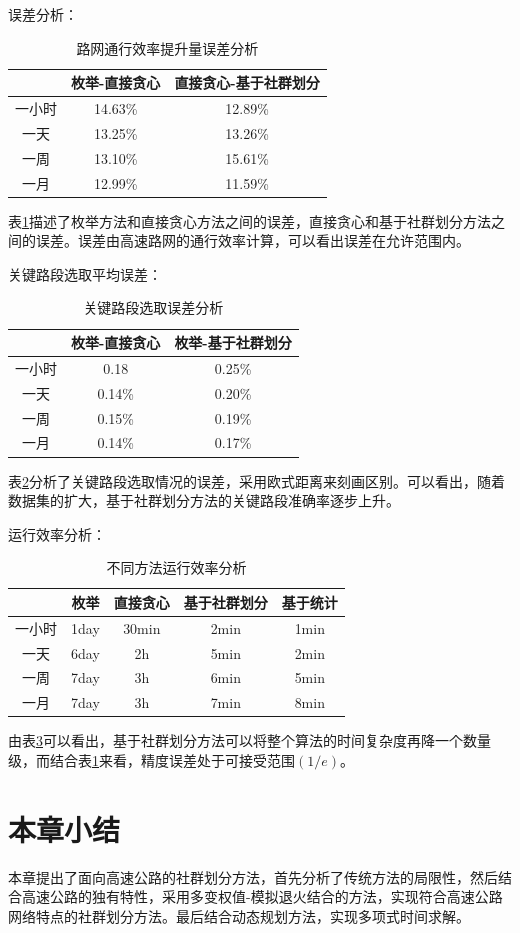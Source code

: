 		误差分析：

				\begin{table}[h]
				\centering
				\begin{tabular}{|c|c|c|}
				\hline
				\hline
				  &  枚举-直接贪心 &  直接贪心-基于社群划分 \\
				\hline
				 一小时 &  14.63\% &  12.89\% \\
				\hline
				 一天 &  13.25\% &  13.26\% \\
				\hline
				 一周 &  13.10\% &  15.61\% \\
				\hline
				 一月 &  12.99\% &  11.59\% \\
				\hline
				\end{tabular}
				\caption{路网通行效率提升量误差分析}
				\label{table1}
				\end{table} 

		表\ref{table1}描述了枚举方法和直接贪心方法之间的误差，直接贪心和基于社群划分方法之间的误差。误差由高速路网的通行效率计算，可以看出误差在允许范围内。

		关键路段选取平均误差：

				\begin{table}[h]
				\centering
				\begin{tabular}{|c|c|c|}
				\hline
				\hline
				   &   枚举-直接贪心 &   枚举-基于社群划分 \\
				\hline
				  一小时 &   0.18 &   0.25\% \\
				\hline
				  一天 &   0.14\% &   0.20\% \\
				\hline
				  一周 &   0.15\% &   0.19\% \\
				\hline
				  一月 &   0.14\% &   0.17\% \\
				\hline
				\end{tabular}
				\caption{关键路段选取误差分析}
				\label{table2}
				\end{table} 

		表\ref{table2}分析了关键路段选取情况的误差，采用欧式距离来刻画区别。可以看出，随着数据集的扩大，基于社群划分方法的关键路段准确率逐步上升。

		运行效率分析：

				\begin{table}[h]
				\centering
				\begin{tabular}{|c|c|c|c|c|}
				\hline
				\hline
				   &   枚举 &   直接贪心 &   基于社群划分 &   基于统计 \\
				\hline
				  一小时 &   1day &   30min &   2min &   1min \\
				\hline
				  一天 &   6day &   2h &   5min &   2min \\
				\hline
				  一周 &  7day &   3h &   6min &   5min \\
				\hline
				  一月 &   7day &   3h &   7min &   8min \\
				\hline
				\end{tabular}
				\caption{不同方法运行效率分析}
				\label{table3}
				\end{table} 

		由表\ref{table3}可以看出，基于社群划分方法可以将整个算法的时间复杂度再降一个数量级，而结合表\ref{table1}来看，精度误差处于可接受范围$(1/e)$。

	\section{本章小结}
		本章提出了面向高速公路的社群划分方法，首先分析了传统方法的局限性，然后结合高速公路的独有特性，采用多变权值-模拟退火结合的方法，实现符合高速公路网络特点的社群划分方法。最后结合动态规划方法，实现多项式时间求解。